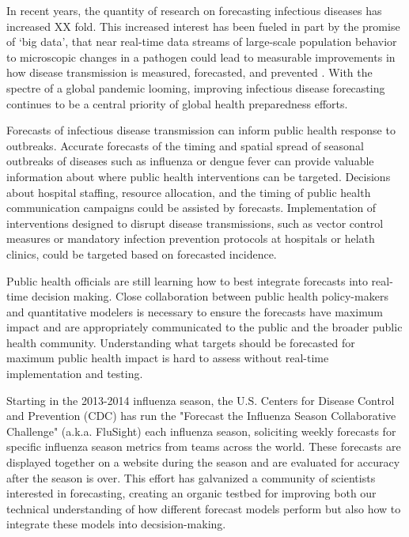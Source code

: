 \documentclass{article}
\begin{document}
In recent years, the quantity of research on forecasting infectious diseases has increased XX fold. 
This increased interest has been fueled in part by the promise of `big data', that near real-time data streams of large-scale population behavior \cite{Molodecky2017} to microscopic changes in a pathogen \cite{Du2017} could lead to measurable improvements in how disease transmission is measured, forecasted, and prevented \cite{Bansal2016}. 
With the spectre of a global pandemic looming, improving infectious disease forecasting continues to be a central priority of global health preparedness efforts.\cite{Myers2000,WHO2016}

Forecasts of infectious disease transmission can inform public health response to outbreaks. 
Accurate forecasts of the timing and spatial spread of seasonal outbreaks of diseases such as influenza or dengue fever can provide valuable information about where public health interventions can be targeted.
Decisions about hospital staffing, resource allocation, and the timing of public health communication campaigns could be assisted by forecasts. 
Implementation of interventions designed to disrupt disease transmissions, such as vector control measures or mandatory infection prevention protocols at hospitals or helath clinics, could be targeted based on forecasted incidence.

Public health officials are still learning how to best integrate forecasts into real-time decision making.
Close collaboration between public health policy-makers and quantitative modelers is necessary to ensure the forecasts have maximum impact and are appropriately communicated to the public and the broader public health community. 
Understanding what targets should be forecasted for maximum public health impact is hard to assess without real-time implementation and testing.


Starting in the 2013-2014 influenza season, the U.S. Centers for Disease Control and Prevention (CDC) has run the "Forecast the Influenza Season Collaborative Challenge" (a.k.a. FluSight) each influenza season, soliciting weekly forecasts for specific influenza season metrics from teams across the world.
These forecasts are displayed together on a website during the season and are evaluated for accuracy after the season is over.\cite{PhiResearchLab} 
This effort has galvanized a community of scientists interested in forecasting, creating an organic testbed for improving both our technical understanding of how different forecast models perform but also how to integrate these models into decsision-making.
\end{document}
